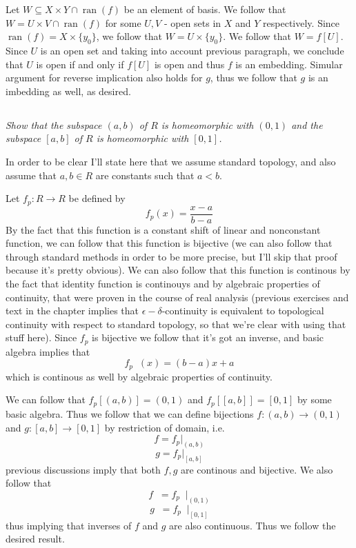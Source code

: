 \documentclass[11pt,oneside,titlepage]{book}
\DeclareMathOperator \inv {^{-1}}
\DeclareMathOperator \ran {ran}
\newcommand{\set}[1]{\{ #1 \}}
\begin{document}
Let $W \subseteq X \times Y \cap \ran(f)$ be an element of basis. We follow that
$W = U \times V \cap \ran(f)$ for some $U, V$ - open sets in $X$ and $Y$ respectively.
Since $\ran(f) = X \times \set{y_0}$, we follow that $W = U \times \set{y_0}$.
We follow that $W = f[U]$. Since $U$ is an open set and taking into
account previous paragraph, we conclude that $U$ is open if and only if $f[U]$ is
open and thus $f$ is an embedding. Simular argument for reverse implication
also holds for $g$, thus we follow that $g$ is an imbedding as well, as desired.

\subsection{}

\textit{Show that the subspace $(a, b)$ of $R$ is homeomorphic with $(0, 1)$ and the subspace
  $[a, b]$ of $R$ is homeomorphic with $[0, 1]$.}

In order to be clear I'll state here that we assume standard topology, and also
assume that $a, b \in R$ are constants such that $a < b$. 

Let $f_p: R \to R$ be defined by
$$f_p(x) = \frac{x - a}{b - a}$$
By the fact that this function is a constant shift of linear and nonconstant function,
we can follow that this function is bijective (we can also follow that through standard methods
in order to be more precise, but I'll skip that proof because it's pretty obvious).
We can also follow that this function is continous by the fact that
identity function is continouys and by algebraic properties of continuity,
that were proven in the course of real analysis (previous exercises and text in the chapter
implies that $\epsilon-\delta$-continuity is equivalent to topological continuity
with respect to standard topology, so that we're clear with using that stuff here).
Since $f_p$ is bijective we follow that it's got an inverse, and basic algebra implies that
$$f_p\inv(x) = (b - a)x + a$$
which is continous as well by algebraic properties of continuity. 

We can follow that $f_p[(a, b)] = (0, 1)$ and $f_p[[a, b]] = [0, 1]$ by some basic algebra.
Thus we follow that we can define bijections $f: (a, b) \to (0, 1)$ and $g: [a, b] \to [0, 1]$
by restriction of domain, i.e.
$$f = f_p|_{(a, b)}$$
$$g = f_p|_{[a, b]}$$
previous discussions imply that both $f, g$ are continous and bijective. We also follow that
$$f\inv = f_p\inv|_{(0, 1)}$$
$$g\inv = f_p\inv|_{[0, 1]}$$
thus implying that inverses of $f$ and $g$ are also continuous. Thus we follow the desired result.
\end{document}
